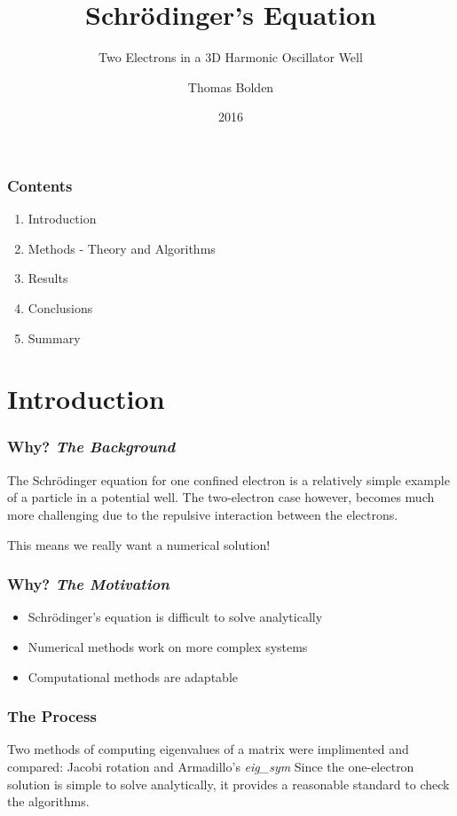 \documentclass[10pt,xcolor={x11names}]{beamer}
\title{Schr\"{o}dinger's Equation}
\subtitle{Two Electrons in a 3D Harmonic Oscillator Well}
\author{Thomas Bolden}
\date{2016}
\begin{document}
	\setcounter{showProgressBar}{0}
	\setcounter{showSlideNumbers}{0}

	\frame{\titlepage}

	\begin{frame}
		\frametitle{Contents}
		\begin{enumerate}
			\item Introduction
			\item Methods - Theory and Algorithms
			\item Results
			\item Conclusions
			\item Summary
		\end{enumerate}
	\end{frame}

	\setcounter{framenumber}{0}
	\setcounter{showProgressBar}{1}
	\setcounter{showSlideNumbers}{1}

	\section{Introduction}

		\begin{frame} \frametitle{Why? {\em The Background}}
			The Schr\"{o}dinger equation for one confined electron is a relatively simple example of a particle in a potential well. The two-electron case however, becomes much more challenging due to the repulsive interaction between the electrons.

			This means we really want a numerical solution!
		\end{frame}

		\begin{frame}
			\frametitle{Why? {\em The Motivation}}
			\begin{itemize}
				\item<1-> Schr\"{o}dinger's equation is difficult to solve analytically
				\item<2-> Numerical methods work on more complex systems
				\item<3-> Computational methods are adaptable
			\end{itemize}
		\end{frame}

		\begin{frame} \frametitle{The Process}
			Two methods of computing eigenvalues of a matrix were implimented and compared: 
			Jacobi rotation and Armadillo's {\em eig\_sym}
			Since the one-electron solution is simple to solve analytically, it provides a reasonable standard to check the algorithms. 
		\end{frame}
\end{document}
